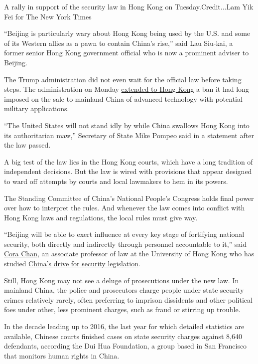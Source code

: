 A rally in support of the security law in Hong Kong on
Tuesday.Credit...Lam Yik Fei for The New York Times

``Beijing is particularly wary about Hong Kong being used by the U.S.
and some of its Western allies as a pawn to contain China's rise,'' said
Lau Siu-kai, a former senior Hong Kong government official who is now a
prominent adviser to Beijing.

The Trump administration did not even wait for the official law before
taking steps. The administration on Monday
\href{https://www.nytimes.com/2020/06/29/business/economy/us-halts-high-tech-exports-hong-kong.html}{extended
to Hong Kong} a ban it had long imposed on the sale to mainland China of
advanced technology with potential military applications.

``The United States will not stand idly by while China swallows Hong
Kong into its authoritarian maw,'' Secretary of State Mike Pompeo said
in a statement after the law passed.

A big test of the law lies in the Hong Kong courts, which have a long
tradition of independent decisions. But the law is wired with provisions
that appear designed to ward off attempts by courts and local lawmakers
to hem in its powers.

The Standing Committee of China's National People's Congress holds final
power over how to interpret the rules. And whenever the law comes into
conflict with Hong Kong laws and regulations, the local rules must give
way.

``Beijing will be able to exert influence at every key stage of
fortifying national security, both directly and indirectly through
personnel accountable to it,'' said
\href{https://www.law.hku.hk/academic_staff/cora-chan/}{Cora Chan}, an
associate professor of law at the University of Hong Kong who has
studied
\href{https://www.bloomsburyprofessional.com/uk/chinas-national-security-9781509928156/}{China's
drive for security legislation}.

Still, Hong Kong may not see a deluge of prosecutions under the new law.
In mainland China, the police and prosecutors charge people under state
security crimes relatively rarely, often preferring to imprison
dissidents and other political foes under other, less prominent charges,
such as fraud or stirring up trouble.

In the decade leading up to 2016, the last year for which detailed
statistics are available, Chinese courts finished cases on state
security charges against 8,640 defendants, according the Dui Hua
Foundation, a group based in San Francisco that monitors human rights in
China.

